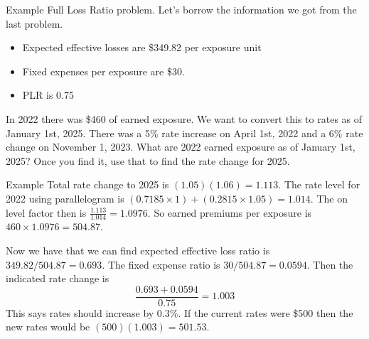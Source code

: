 \documentclass[compress,mathserif]{beamer}
\begin{document}
\begin{frame}{Example}
Full Loss Ratio problem. Let's borrow the information we got from the last problem. 
\begin{itemize}
\item Expected effective losses are \$349.82 per exposure unit
\item  Fixed expenses per exposure are \$30.  
\item PLR is 0.75
\end{itemize} 
In 2022 there was \$460 of earned exposure. We want to convert this to rates as of January 1st, 2025. There was a 5\% rate increase on April 1st, 2022 and a 6\% rate change on November 1, 2023. What are 2022 earned exposure as of January 1st, 2025? Once you find it, use that to find the rate change for 2025. 

\end{frame}

\begin{frame}{Example}
Total rate change to 2025 is $(1.05)(1.06) = 1.113$. The rate level for 2022 using parallelogram is $(0.7185 \times 1) + (0.2815 \times 1.05) = 1.014$. The on level factor then is $\frac{1.113}{1.014} = 1.0976$. So earned premiums per exposure is $460 \times 1.0976 = 504.87$. 

Now we have that we can find expected effective loss ratio is $349.82 / 504.87  = 0.693$. The fixed expense ratio is $30/504.87 = 0.0594$. Then the indicated rate change is \[\frac{0.693 + 0.0594}{0.75} = 1.003\]
This says rates should increase by 0.3\%. If the current rates were \$500 then the new rates would be $(500)(1.003) = 501.53$. 

\end{frame}
\end{document}
